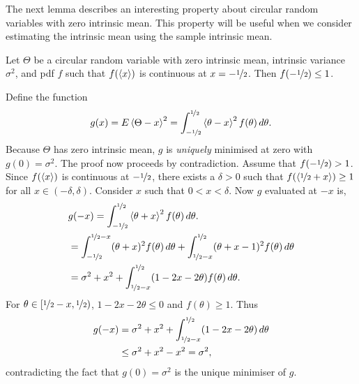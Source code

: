 \documentclass[journal]{IEEEtran}
\begin{document}

The next lemma describes an interesting property about circular random variables with zero intrinsic mean.  This property will be useful when we consider estimating the intrinsic mean using the sample intrinsic mean. 

\begin{lemma}\label{lem:antipolalzerounwpmean}
Let $\Theta$ be a circular random variable with zero intrinsic mean, intrinsic variance $\sigma^2$, and pdf $f$ such that $f(\left< x \right>)$ is continuous at $x = -\nicefrac{1}{2}$.  Then $f(-\nicefrac{1}{2}) \leq 1$.
\end{lemma}
\begin{IEEEproof}
Define the function
\[
g(x) = E\left< \Theta - x \right>^2 = \int_{-\nicefrac{1}{2}}^{\nicefrac{1}{2}}\left< \theta - x \right>^2f(\theta) \, d\theta.
\]
Because $\Theta$ has zero intrinsic mean, $g$ is \emph{uniquely} minimised at zero with $g(0) = \sigma^2$.  The proof now proceeds by contradiction. Assume that $f(-\nicefrac{1}{2}) > 1$.  Since $f(\left< x \right>)$ is continuous at $-\nicefrac{1}{2}$, there exists a $\delta > 0$ such that $f(\left< \nicefrac{1}{2} + x \right>) \geq 1$ for all $x \in (-\delta, \delta)$.  Consider $x$ such that $0 < x < \delta$.  Now $g$ evaluated at $-x$ is,
\begin{align*}
&g(-x) = \int_{-\nicefrac{1}{2}}^{\nicefrac{1}{2}}\left< \theta + x \right>^2 f(\theta) \, d\theta. \\
&= \int_{-\nicefrac{1}{2}}^{\nicefrac{1}{2} - x}(\theta + x)^2 f(\theta) \, d\theta + \int_{\nicefrac{1}{2} - x}^{\nicefrac{1}{2}}(\theta + x - 1)^2 f(\theta) \, d\theta \\
&= \sigma^2 + x^2 + \int_{\nicefrac{1}{2} - x}^{\nicefrac{1}{2}}(1 - 2x - 2\theta)f(\theta) \, d\theta.
\end{align*}
For $\theta \in [\nicefrac{1}{2} - x, \nicefrac{1}{2})$, $1 - 2x - 2\theta \leq 0$ and $f(\theta) \geq 1$. Thus
\begin{align*}
g(-x) &= \sigma^2 + x^2 + \int_{\nicefrac{1}{2} - x}^{\nicefrac{1}{2}}(1 - 2x - 2\theta) \, d\theta \\
&\leq \sigma^2 + x^2 - x^2 = \sigma^2,
\end{align*}
contradicting the fact that $g(0) = \sigma^2$ is the unique minimiser of $g$.
\end{IEEEproof}
\end{document}
